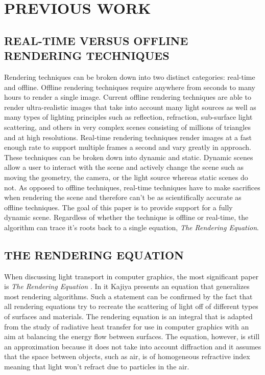 \chapter{PREVIOUS WORK} \label{sec:prevwork}

\section{REAL-TIME VERSUS OFFLINE RENDERING TECHNIQUES}

Rendering techniques can be broken down into two distinct categories: real-time and offline.  Offline rendering techniques require anywhere from seconds to many hours to render a single image.  Current offline rendering techniques are able to render ultra-realistic images that take into account many light sources as well as many types of lighting principles such as reflection, refraction, sub-surface light scattering, and others in very complex scenes consisting of millions of triangles and at high resolutions.  Real-time rendering techniques render images at a fast enough rate to support multiple frames a second and vary greatly in approach.  These techniques can be broken down into dynamic and static.  Dynamic scenes allow a user to interact with the scene and actively change the scene such as moving the geometry, the camera, or the light source whereas static scenes do not.  As opposed to offline techniques, real-time techniques have to make sacrifices when rendering the scene and therefore can't be as scientifically accurate as offline techniques.  The goal of this paper is to provide support for a fully dynamic scene.  Regardless of whether the technique is offline or real-time, the algorithm can trace it's roots back to a single equation, \textit{The Rendering Equation}.

\section{THE RENDERING EQUATION} \label{sec:render}

When discussing light transport in computer graphics, the most significant paper is \textit{The Rendering Equation} \cite{Kajiya1986}.  In it Kajiya presents an equation that generalizes most rendering algorithms.  Such a statement can be confirmed by the fact that all rendering equations try to recreate the scattering of light off of different types of surfaces and materials.  The rendering equation is an integral that is adapted from the study of radiative heat transfer for use in computer graphics with an aim at balancing the energy flow between surfaces.  The equation, however, is still an approximation because it does not take into account diffraction and it assumes that the space between objects, such as air, is of homogeneous refractive index meaning that light won't refract due to particles in the air.

